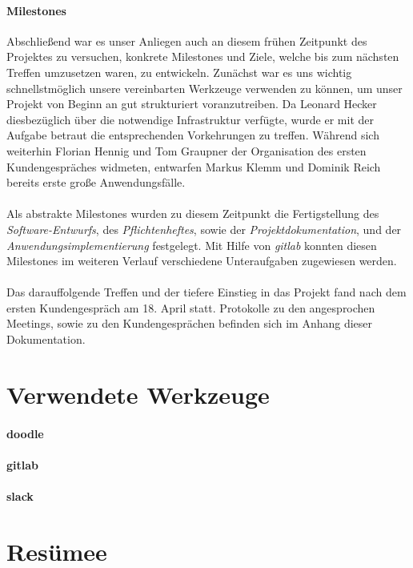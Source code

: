 \paragraph{Milestones}Abschließend war es unser Anliegen auch an diesem frühen Zeitpunkt des Projektes zu versuchen, konkrete Milestones und Ziele, welche bis zum nächsten Treffen umzusetzen waren, zu entwickeln. Zunächst war es uns wichtig schnellstmöglich unsere vereinbarten Werkzeuge verwenden zu können, um unser Projekt von Beginn an gut strukturiert voranzutreiben. Da Leonard Hecker diesbezüglich über die notwendige Infrastruktur verfügte, wurde er mit der Aufgabe betraut die entsprechenden Vorkehrungen zu treffen. Während sich weiterhin Florian Hennig und Tom Graupner der Organisation des ersten Kundengespräches widmeten, entwarfen Markus Klemm und Dominik Reich bereits erste große Anwendungsfälle.

\paragraph{}Als abstrakte Milestones wurden zu diesem Zeitpunkt die Fertigstellung des \textit{Software-Entwurfs}, des \textit{Pflichtenheftes}, sowie der \textit{Projektdokumentation}, und der \textit{Anwendungsimplementierung} festgelegt. Mit Hilfe von \textit{gitlab} konnten diesen Milestones im weiteren Verlauf verschiedene Unteraufgaben zugewiesen werden.

\paragraph{}Das darauffolgende Treffen und der tiefere Einstieg in das Projekt fand nach dem ersten Kundengespräch am 18. April statt. Protokolle zu den angesprochen Meetings, sowie zu den Kundengesprächen befinden sich im Anhang dieser Dokumentation.

\section{Verwendete Werkzeuge}\label{TeamOrg:Werkzeuge}
\paragraph{doodle}
\paragraph{gitlab}
\paragraph{slack}
\section{Resümee}




